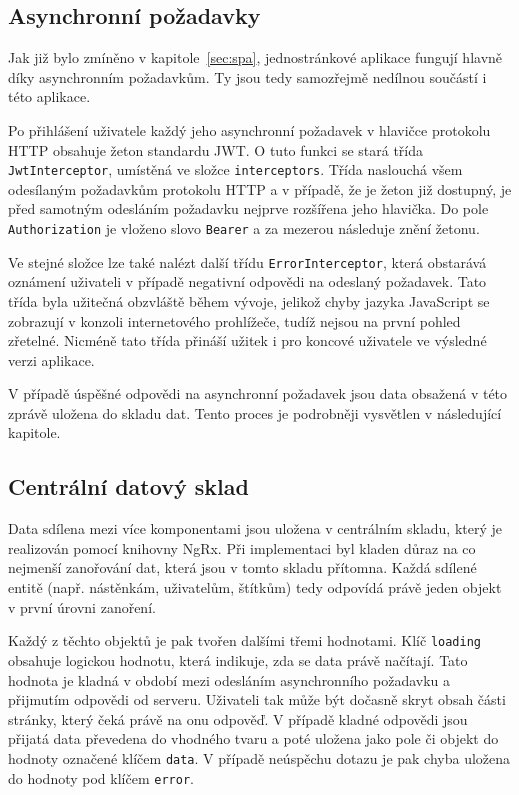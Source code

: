 \subsection{Asynchronní požadavky}
Jak již bylo zmíněno v kapitole~\ref{sec:spa}, jednostránkové aplikace fungují hlavně díky asynchronním požadavkům. Ty jsou tedy samozřejmě nedílnou součástí i této aplikace.

Po přihlášení uživatele každý jeho asynchronní požadavek v hlavičce protokolu HTTP obsahuje žeton standardu JWT. O tuto funkci se stará třída \texttt{JwtInterceptor}, umístěná ve složce \texttt{interceptors}. Třída naslouchá všem odesílaným požadavkům protokolu HTTP a v případě, že je žeton již dostupný, je před samotným odesláním požadavku nejprve rozšířena jeho hlavička. Do pole \texttt{Authorization} je vloženo slovo \texttt{Bearer} a za mezerou následuje znění žetonu.

Ve stejné složce lze také nalézt další třídu \texttt{ErrorInterceptor}, která obstarává oznámení uživateli v případě negativní odpovědi na odeslaný požadavek. Tato třída byla užitečná obzvláště během vývoje, jelikož chyby jazyka JavaScript se zobrazují v konzoli internetového prohlížeče, tudíž nejsou na první pohled zřetelné. Nicméně tato třída přináší užitek i pro koncové uživatele ve výsledné verzi aplikace.

V případě úspěšné odpovědi na asynchronní požadavek jsou data obsažená v této zprávě uložena do skladu dat. Tento proces je podrobněji vysvětlen v následující kapitole.


\subsection{Centrální datový sklad}
Data sdílena mezi více komponentami jsou uložena v centrálním skladu, který je realizován pomocí knihovny NgRx. Při implementaci byl kladen důraz na co nejmenší zanořování dat, která jsou v tomto skladu přítomna. Každá sdílené entitě (např. nástěnkám, uživatelům, štítkům) tedy odpovídá právě jeden objekt v první úrovni zanoření.

Každý z těchto objektů je pak tvořen dalšími třemi hodnotami. Klíč \texttt{loading} obsahuje logickou hodnotu, která indikuje, zda se data právě načítají. Tato hodnota je kladná v období mezi odesláním asynchronního požadavku a přijmutím odpovědi od serveru. Uživateli tak může být dočasně skryt obsah části stránky, který čeká právě na onu odpověď. V případě kladné odpovědi jsou přijatá data převedena do vhodného tvaru a poté uložena jako pole či objekt do hodnoty označené klíčem \texttt{data}. V případě neúspěchu dotazu je pak chyba uložena do hodnoty pod klíčem \texttt{error}.

